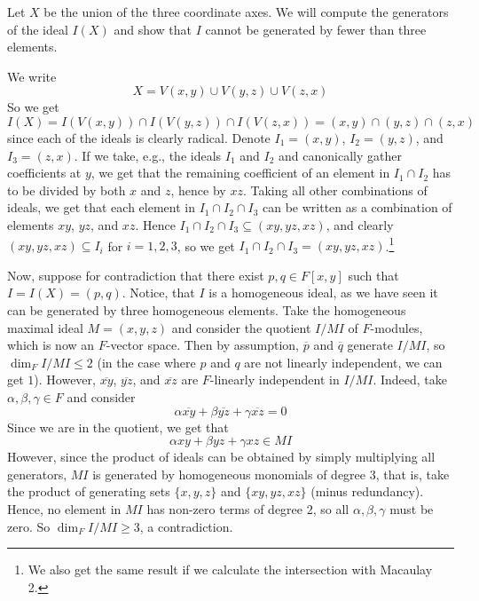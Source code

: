 \documentclass[a4paper, 12pt]{article}
\begin{document}
\begin{Exercise}
    Let $X$ be the union of the three coordinate axes.
    We will compute the generators of the ideal $I(X)$ and show that $I$ cannot be generated by fewer than three elements.

    We write
    \[
        X = V(x,y) \cup V(y, z) \cup V(z, x)
    \]
    So we get
    \[
        I(X) = I(V(x, y)) \cap I(V(y, z)) \cap I(V(z, x)) = (x, y) \cap (y, z) \cap (z, x)
    \]
    since each of the ideals is clearly radical.
    Denote $I_1 = (x, y)$, $I_2 = (y, z)$, and $I_3 = (z, x)$.
    If we take, e.g., the ideals $I_1$ and $I_2$ and canonically gather coefficients at $y$,
    we get that the remaining coefficient of an element in $I_1 \cap I_2$ has to be divided by both $x$ and $z$, hence by $xz$.
    Taking all other combinations of ideals, we get that each element in $I_1 \cap I_2 \cap I_3$ can be written as a combination of elements $xy$, $yz$, and $xz$.
    Hence $I_1 \cap I_2 \cap I_3 \subseteq (xy, yz, xz)$, and clearly $(xy, yz, xz) \subseteq I_i$ for $i = 1, 2, 3$, so we get $I_1 \cap I_2 \cap I_3 = (xy, yz, xz)$.\footnote{We also get the same result if we calculate the intersection with Macaulay 2.}

    Now, suppose for contradiction that there exist $p, q \in F[x, y]$ such that $I = I(X) = (p, q)$.
    Notice, that $I$ is a homogeneous ideal, as we have seen it can be generated by three homogeneous elements.
    Take the homogeneous maximal ideal $M = (x, y, z)$ and consider the quotient $I/MI$ of $F$-modules, which is now an $F$-vector space.
    Then by assumption, $\overline{p}$ and $\overline{q}$ generate $I/MI$, so $\dim_F I/MI \leq 2$ (in the case where $p$ and $q$ are not linearly independent, we can get $1$).
    However, $\overline{xy}$, $\overline{yz}$, and $\overline{xz}$ are $F$-linearly independent in $I/MI$.
    Indeed, take $\alpha, \beta, \gamma \in F$ and consider
    \[
        \alpha \overline{xy} + \beta \overline{yz} + \gamma \overline{xz} = 0
    \]
    Since we are in the quotient, we get that
    \[
        \alpha xy + \beta yz + \gamma xz \in MI
    \]
    However, since the product of ideals can be obtained by simply multiplying all generators,
    $MI$ is generated by homogeneous monomials of degree $3$, that is,
    take the product of generating sets $\lbrace x, y, z \rbrace$ and $\lbrace xy, yz, xz \rbrace$ (minus redundancy).
    Hence, no element in $MI$ has non-zero terms of degree $2$, so all $\alpha, \beta, \gamma$ must be zero.
    So $\dim_F I/MI \geq 3$, a contradiction.
\end{Exercise}
\end{document}
